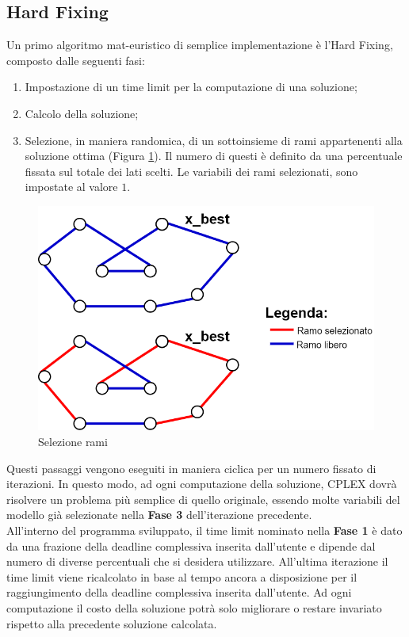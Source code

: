 \subsection{Hard Fixing}\label{hard fixing}
Un primo algoritmo mat-euristico di semplice implementazione è l'Hard Fixing, composto dalle seguenti fasi:
\begin{enumerate}
\item{Impostazione di un time limit per la computazione di una soluzione;}
\item{Calcolo della soluzione;}
\item{Selezione, in maniera randomica, di un sottoinsieme di rami appartenenti alla soluzione ottima (Figura \ref{selezione_rami}). 
Il numero di questi è definito da una percentuale fissata sul totale dei lati scelti. Le variabili dei rami selezionati, sono impostate al valore $1$.}
\end{enumerate}
\begin{figure}[h] 
\begin{center} 
  \includegraphics[scale=0.38]{Images/x_best} 
  \caption{\footnotesize{Selezione rami}}
  \label{selezione_rami} 
\end{center} 
\end{figure}
Questi passaggi vengono eseguiti in maniera ciclica per un numero fissato di iterazioni. In questo modo, ad ogni computazione della soluzione, CPLEX dovrà risolvere un problema più semplice di quello originale, essendo molte variabili del modello già selezionate nella \textbf{Fase 3} dell'iterazione precedente.\\
All'interno del programma sviluppato, il time limit nominato nella \textbf{Fase 1} è dato da una frazione della deadline complessiva inserita dall'utente e dipende dal numero di diverse percentuali che si desidera utilizzare. All'ultima iterazione il time limit viene ricalcolato in base al tempo ancora a disposizione per il raggiungimento della deadline complessiva inserita dall'utente. Ad ogni computazione il costo della soluzione potrà solo migliorare o restare invariato rispetto alla precedente soluzione calcolata.\\
